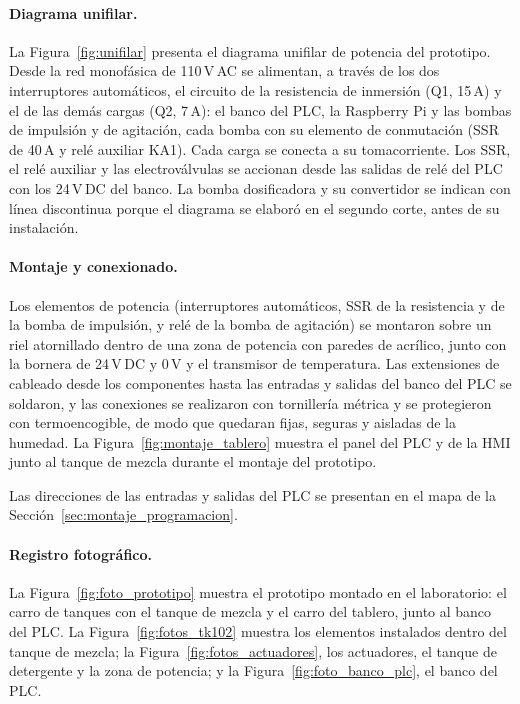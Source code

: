 \paragraph{Diagrama unifilar.} La Figura~\ref{fig:unifilar} presenta el diagrama unifilar de potencia del prototipo. Desde la red monofásica de 110\,V\,AC se alimentan, a través de los dos interruptores automáticos, el circuito de la resistencia de inmersión (Q1, 15\,A) y el de las demás cargas (Q2, 7\,A): el banco del PLC, la Raspberry Pi y las bombas de impulsión y de agitación, cada bomba con su elemento de conmutación (SSR de 40\,A y relé auxiliar KA1). Cada carga se conecta a su tomacorriente. Los SSR, el relé auxiliar y las electroválvulas se accionan desde las salidas de relé del PLC con los 24\,V\,DC del banco. La bomba dosificadora y su convertidor se indican con línea discontinua porque el diagrama se elaboró en el segundo corte, antes de su instalación.


\paragraph{Montaje y conexionado.} Los elementos de potencia (interruptores automáticos, SSR de la resistencia y de la bomba de impulsión, y relé de la bomba de agitación) se montaron sobre un riel atornillado dentro de una zona de potencia con paredes de acrílico, junto con la bornera de 24\,V\,DC y 0\,V y el transmisor de temperatura. Las extensiones de cableado desde los componentes hasta las entradas y salidas del banco del PLC se soldaron, y las conexiones se realizaron con tornillería métrica y se protegieron con termoencogible, de modo que quedaran fijas, seguras y aisladas de la humedad. La Figura~\ref{fig:montaje_tablero} muestra el panel del PLC y de la HMI junto al tanque de mezcla durante el montaje del prototipo.


Las direcciones de las entradas y salidas del PLC se presentan en el mapa de la Sección~\ref{sec:montaje_programacion}.

\paragraph{Registro fotográfico.} La Figura~\ref{fig:foto_prototipo} muestra el prototipo montado en el laboratorio: el carro de tanques con el tanque de mezcla y el carro del tablero, junto al banco del PLC. La Figura~\ref{fig:fotos_tk102} muestra los elementos instalados dentro del tanque de mezcla; la Figura~\ref{fig:fotos_actuadores}, los actuadores, el tanque de detergente y la zona de potencia; y la Figura~\ref{fig:foto_banco_plc}, el banco del PLC.

